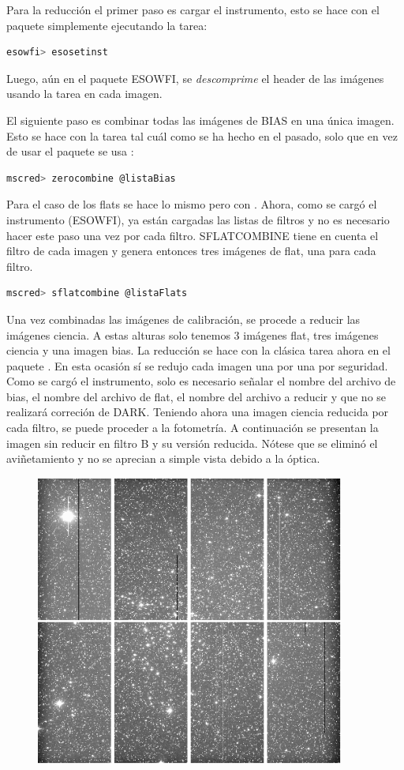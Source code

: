 \documentclass[12pt]{article}
\begin{document}
Para la reducción el primer paso es cargar el instrumento, esto se hace con el paquete  simplemente ejecutando la tarea:
\begin{lstlisting}[language=bash]
 esowfi> esosetinst
\end{lstlisting}

Luego, aún en el paquete ESOWFI, se \emph{descomprime} el header de las imágenes usando la tarea  en cada imagen.

El siguiente paso es combinar todas las imágenes de BIAS en una única imagen. Esto se hace con la tarea  tal cuál como se ha hecho en el pasado, solo que en vez de usar el paquete  se usa  :
\begin{lstlisting}[language=bash]
 mscred> zerocombine @listaBias
\end{lstlisting}
Para el caso de los flats se hace lo mismo pero con .
Ahora, como se cargó el instrumento (ESOWFI), ya están cargadas las listas de filtros y no es necesario hacer este paso una vez por cada filtro. SFLATCOMBINE tiene en cuenta el filtro de cada imagen y genera entonces tres imágenes de flat, una para cada filtro.
\begin{lstlisting}[language=bash]
 mscred> sflatcombine @listaFlats
\end{lstlisting}

Una vez combinadas las imágenes de calibración, se procede a reducir las imágenes ciencia. A estas alturas solo tenemos 3 imágenes flat, tres imágenes ciencia y una imagen bias. La reducción se hace con la clásica tarea  ahora en el paquete . En esta ocasión sí se redujo cada imagen una por una por seguridad. Como se cargó el instrumento, solo es necesario señalar el nombre del archivo de bias, el nombre del archivo de flat, el nombre del archivo a reducir y que no se realizará correción de DARK. Teniendo ahora una imagen ciencia reducida por cada filtro, se puede proceder a la fotometría. A continuación se presentan la imagen sin reducir en filtro B y su versión reducida. Nótese que se  eliminó el aviñetamiento y no se aprecian a simple vista  debido a la óptica.

\begin{figure}[H]
  \centering
   \includegraphics[width = 4in]{mosaicoBVineta.png}
\end{figure}
\end{document}
